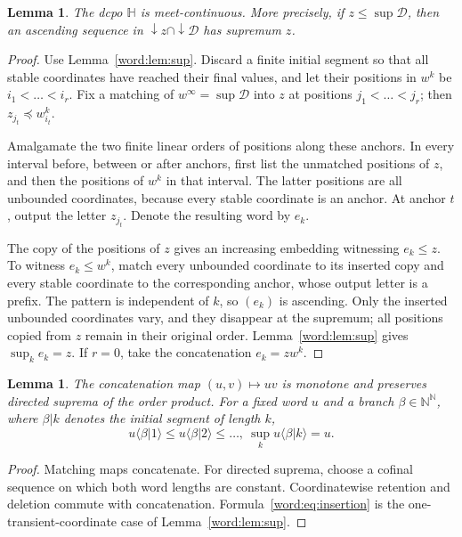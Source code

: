 \documentclass[fleqn,preprint,3p,a4paper]{elsarticle}
\newtheorem{lemma}[theorem]{Lemma}
\theoremstyle{definition}
\newcommand{\N}{\mathbb N}
\newcommand{\HH}{\mathbb H}
\begin{document}
\begin{lemma}\label{word:lem:mc}
The dcpo $\HH$ is meet-continuous. More precisely, if $z\leq\sup\mathcal D$, then an ascending sequence in ${\downarrow} z\cap{\downarrow}\mathcal D$ has supremum $z$.
\end{lemma}
\begin{proof}
Use Lemma~\ref{word:lem:sup}. Discard a finite initial segment so that all stable coordinates have reached their final values, and let their positions in $w^k$ be $i_1<\ldots<i_r$. Fix a matching of $w^\infty=\sup\mathcal D$ into $z$ at positions $j_1<\ldots<j_r$; then $z_{j_t}\preceq w^k_{i_t}$.

Amalgamate the two finite linear orders of positions along these anchors. In every interval before, between or after anchors, first list the unmatched positions of $z$, and then the positions of $w^k$ in that interval. The latter positions are all unbounded coordinates, because every stable coordinate is an anchor. At anchor $t$, output the letter $z_{j_t}$. Denote the resulting word by $e_k$.

The copy of the positions of $z$ gives an increasing embedding witnessing $e_k\leq z$. To witness $e_k\leq w^k$, match every unbounded coordinate to its inserted copy and every stable coordinate to the corresponding anchor, whose output letter is a prefix. The pattern is independent of $k$, so $(e_k)$ is ascending. Only the inserted unbounded coordinates vary, and they disappear at the supremum; all positions copied from $z$ remain in their original order. Lemma~\ref{word:lem:sup} gives $\sup_k e_k=z$. If $r=0$, take the concatenation $e_k=zw^k$.
\end{proof}

\begin{lemma}\label{word:lem:concat}
The concatenation map $(u,v)\mapsto uv$ is monotone and preserves directed suprema of the order product. For a fixed word $u$ and a branch $\beta\in\N^\N$, where $\beta|k$ denotes the initial segment of length $k$,
\begin{equation}\label{word:eq:insertion}
 u\langle\beta|1\rangle\leq u\langle\beta|2\rangle\leq\ldots,
 ~
 \sup_k u\langle\beta|k\rangle=u.
\end{equation}
\end{lemma}
\begin{proof}
Matching maps concatenate. For directed suprema, choose a cofinal sequence on which both word lengths are constant. Coordinatewise retention and deletion commute with concatenation. Formula~\eqref{word:eq:insertion} is the one-transient-coordinate case of Lemma~\ref{word:lem:sup}.
\end{proof}
\end{document}
